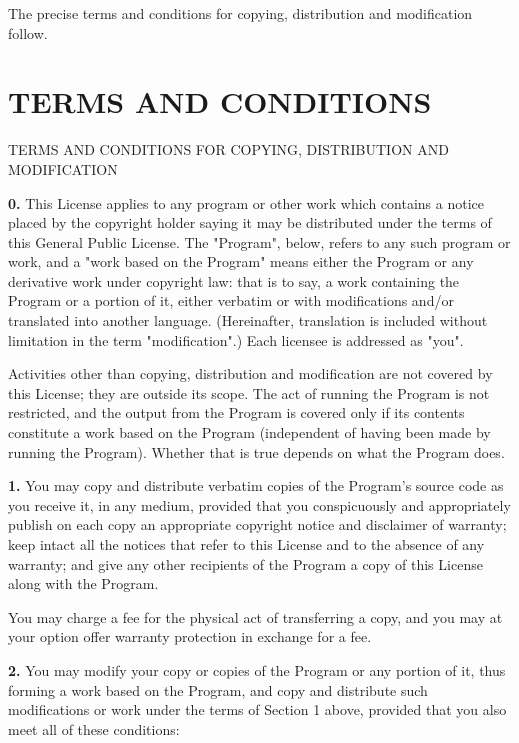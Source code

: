 The precise terms and conditions for copying, distribution and modification
follow.

\section{TERMS AND CONDITIONS}
\label{SEC3}

TERMS AND CONDITIONS FOR COPYING, DISTRIBUTION AND MODIFICATION

{\bf 0.} This License applies to any program or other work which contains a
notice placed by the copyright holder saying it may be distributed under the
terms of this General Public License. The "Program", below, refers to any
such program or work, and a "work based on the Program" means either the
Program or any derivative work under copyright law: that is to say, a work
containing the Program or a portion of it, either verbatim or with
modifications and/or translated into another language. (Hereinafter,
translation is included without limitation in the term "modification".) Each
licensee is addressed as "you".

Activities other than copying, distribution and modification are not covered
by this License; they are outside its scope. The act of running the Program is
not restricted, and the output from the Program is covered only if its
contents constitute a work based on the Program (independent of having been
made by running the Program). Whether that is true depends on what the Program
does.

{\bf 1.} You may copy and distribute verbatim copies of the Program's source
code as you receive it, in any medium, provided that you conspicuously and
appropriately publish on each copy an appropriate copyright notice and
disclaimer of warranty; keep intact all the notices that refer to this License
and to the absence of any warranty; and give any other recipients of the
Program a copy of this License along with the Program.

You may charge a fee for the physical act of transferring a copy, and you may
at your option offer warranty protection in exchange for a fee.

{\bf 2.} You may modify your copy or copies of the Program or any portion of
it, thus forming a work based on the Program, and copy and distribute such
modifications or work under the terms of Section 1 above, provided that you
also meet all of these conditions:

